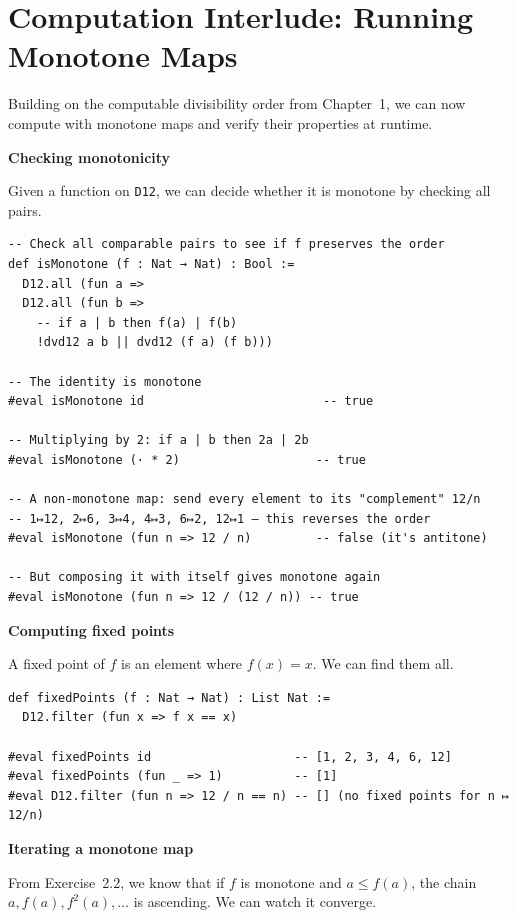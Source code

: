 \documentclass[12pt, a4paper, openright]{book}
\theoremstyle{thmstyle}
\theoremstyle{defstyle}
\newcommand{\lc}[1]{\texttt{#1}}
\begin{document}
\FloatBarrier
\section{Computation Interlude: Running Monotone Maps}

Building on the computable divisibility order from Chapter~1, we can now compute
with monotone maps and verify their properties at runtime.

\textbf{Checking monotonicity}

Given a function on \lc{D12}, we can decide whether it is monotone by checking
all pairs.

\begin{verbatim}
-- Check all comparable pairs to see if f preserves the order
def isMonotone (f : Nat → Nat) : Bool :=
  D12.all (fun a =>
  D12.all (fun b =>
    -- if a | b then f(a) | f(b)
    !dvd12 a b || dvd12 (f a) (f b)))

-- The identity is monotone
#eval isMonotone id                         -- true

-- Multiplying by 2: if a | b then 2a | 2b
#eval isMonotone (· * 2)                   -- true

-- A non-monotone map: send every element to its "complement" 12/n
-- 1↦12, 2↦6, 3↦4, 4↦3, 6↦2, 12↦1 — this reverses the order
#eval isMonotone (fun n => 12 / n)         -- false (it's antitone)

-- But composing it with itself gives monotone again
#eval isMonotone (fun n => 12 / (12 / n)) -- true
\end{verbatim}

\textbf{Computing fixed points}

A fixed point of $f$ is an element where $f(x) = x$. We can find them all.

\begin{verbatim}
def fixedPoints (f : Nat → Nat) : List Nat :=
  D12.filter (fun x => f x == x)

#eval fixedPoints id                    -- [1, 2, 3, 4, 6, 12]
#eval fixedPoints (fun _ => 1)          -- [1]
#eval D12.filter (fun n => 12 / n == n) -- [] (no fixed points for n ↦ 12/n)
\end{verbatim}

\textbf{Iterating a monotone map}

From Exercise~2.2, we know that if $f$ is monotone and $a \leq f(a)$, the chain
$a, f(a), f^2(a), \ldots$ is ascending. We can watch it converge.
\end{document}
